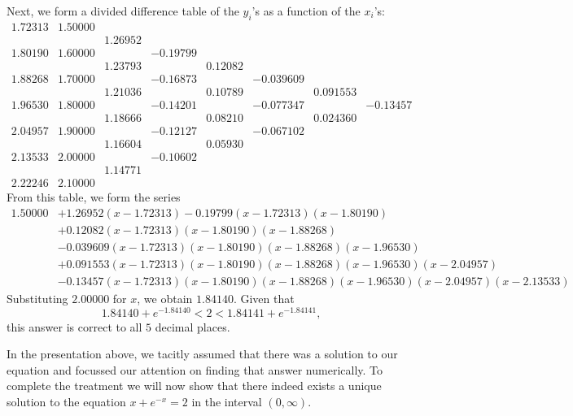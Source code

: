 \documentclass[12pt]{article}
\begin{document}
Next, we form a divided difference table of the $y_i$'s as a 
function of the $x_i$'s:
\[
\begin{matrix}
1.72313 & 1.50000 &         &          &         &           & & \\
        &         & 1.26952 &          &         &           & & \\
1.80190 & 1.60000 &         & -0.19799 &         &           & & \\
        &         & 1.23793 &          & 0.12082 &           & & \\
1.88268 & 1.70000 &         & -0.16873 &         & -0.039609 & & \\
        &         & 1.21036 &          & 0.10789 &           & 0.091553 & \\
1.96530 & 1.80000 &         & -0.14201 &         & -0.077347 & & -0.13457 \\
        &         & 1.18666 &          & 0.08210 &           & 0.024360 & \\
2.04957 & 1.90000 &         & -0.12127 &         & -0.067102 & & \\
        &         & 1.16604 &          & 0.05930 &           & & \\
2.13533 & 2.00000 &         & -0.10602 &         &           & & \\
        &         & 1.14771 &          &         &           & & \\
2.22246 & 2.10000 &         &          &         &           & &
\end{matrix}
\]
From this table, we form the series
\begin{align*}
1.50000 &+ 1.26952 (x - 1.72313) - 0.19799 (x - 1.72313) (x - 1.80190) \\
&+ 0.12082 (x - 1.72313) (x - 1.80190) (x - 1.88268) \\
&- 0.039609 (x - 1.72313) (x - 1.80190) (x - 1.88268) (x - 1.96530) \\
&+ 0.091553 (x - 1.72313) (x - 1.80190) (x - 1.88268) (x - 1.96530)
(x - 2.04957) \\
&- 0.13457 (x - 1.72313) (x - 1.80190) (x - 1.88268) (x - 1.96530)
(x - 2.04957) (x - 2.13533)
\end{align*}
Substituting $2.00000$ for $x$, we obtain $1.84140$.  Given that
\[
1.84140 + e^{-1.84140} < 2 < 1.84141 + e^{-1.84141},
\]
this answer is correct to all $5$ decimal places.

In the presentation above, we tacitly assumed that there was a
solution to our equation and focussed our attention on finding 
that answer numerically.  To complete the treatment we will 
now show that there indeed exists a unique solution to the 
equation $x + e^{-x} = 2$ in the interval $(0,\infty)$.
\end{document}
